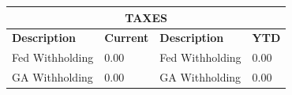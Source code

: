 \documentclass[12pt]{article}
\begin{document}
\vspace{0.25in}

\begin{tabular}{|p{1.5in}|p{1in}|p{1.5in}|p{1in}|}
    \hline
    \multicolumn{4}{|c|}{\textbf{TAXES}} \\
    \hline
    \textbf{Description} & \textbf{Current} & \textbf{Description} & \textbf{YTD} \\
    \hline
    Fed Withholding & 0.00 & Fed Withholding & 0.00 \\
    GA Withholding & 0.00 & GA Withholding & 0.00 \\
    \hline
\end{tabular}
\end{document}
